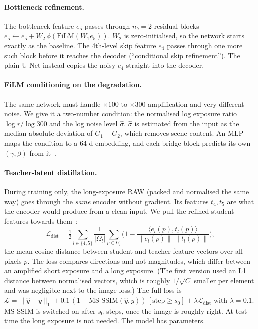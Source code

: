 \paragraph{Bottleneck refinement.} The bottleneck feature $e_5$ passes through $n_b=2$ residual blocks $e_5 \leftarrow e_5 + W_2\,\phi(\text{FiLM}(W_1 e_5))$. $W_2$ is zero-initialised, so the network starts exactly as the baseline. The 4th-level skip feature $e_4$ passes through one more such block before it reaches the decoder (``conditional skip refinement''). The plain U-Net instead copies the noisy $e_4$ straight into the decoder.

\paragraph{FiLM conditioning on the degradation.} The same network must handle $\times100$ to $\times300$ amplification and very different noise. We give it a two-number condition: the normalised log exposure ratio $\log r/\log 300$ and the log noise level $\hat\sigma$. $\hat\sigma$ is estimated from the input as the median absolute deviation of $G_1-G_2$, which removes scene content. An MLP maps the condition to a 64-d embedding, and each bridge block predicts its own $(\gamma,\beta)$ from it~\cite{perez2018film}.

\paragraph{Teacher-latent distillation.} During training only, the long-exposure RAW (packed and normalised the same way) goes through the \emph{same} encoder without gradient. Its features $t_4,t_5$ are what the encoder would produce from a clean input. We pull the refined student features towards them~\cite{romero2015fitnets,vapnik2009lupi}:
\begin{equation}
\mathcal{L}_{\text{dist}} = \tfrac12\sum_{l\in\{4,5\}} \frac{1}{|\Omega_l|}\sum_{p\in\Omega_l}\Big(1-\frac{\langle e_l(p), t_l(p)\rangle}{\|e_l(p)\|\,\|t_l(p)\|}\Big),
\end{equation}
the mean cosine distance between student and teacher feature vectors over all pixels $p$. The loss compares directions and not magnitudes, which differ between an amplified short exposure and a long exposure. (The first version used an L1 distance between normalised vectors, which is roughly $1/\sqrt{C}$ smaller per element and was negligible next to the image loss.) The full loss is
$\mathcal{L} = \|\hat y-y\|_1 + 0.1\,(1-\text{MS-SSIM}(\hat y,y))\,[\text{step}\ge s_0] + \lambda\mathcal{L}_{\text{dist}}$
with $\lambda=0.1$. MS-SSIM is switched on after $s_0$ steps, once the image is roughly right. At test time the long exposure is not needed. The model has \BRIDGEPARAMS{} parameters.

